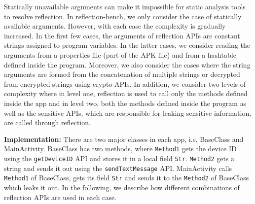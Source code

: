 Statically unavailable arguments can make it impossible for static analysis tools to resolve reflection. In reflection-bench, we only consider the case of statically available arguments. However, with each case the complexity is gradually increased. In the first few cases, the arguments of reflection APIs are constant strings assigned to program variables. In the latter cases, we consider reading the arguments from a properties file (part of the APK file) and from a hashtable defined inside the program. Moreover, we also consider the cases where the string arguments are formed from the concatenation of multiple strings or decrypted from encrypted strings using crypto APIs. In addition, we consider two levels of complexity where in level one, reflection is used to call only the methods defined inside the app and in level two, both the methods defined inside the program as well as the sensitive APIs, which are responsible for leaking sensitive information, are called through reflection.

\textbf{Implementation:} There are two major classes in each app, i.e, BaseClass and MainActivity. BaseClass has two methods, where \texttt{Method1} gets the device ID using the \texttt{getDeviceID} API and stores it in a local field \texttt{Str}. \texttt{Method2} gets a string and sends it out using the \texttt{sendTextMessage} API. MainActivity calls \texttt{Method1} of BaseClass, gets its field \texttt{Str} and sends it to the \texttt{Method2} of BaseClass which leaks it out. In the following, we describe how different combinations of reflection APIs are used in each case.


